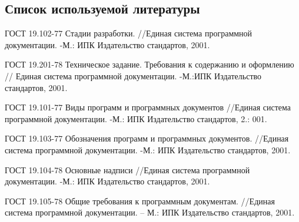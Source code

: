 \subsection{Список используемой литературы}
\begin{my_enumerate}

\item
ГОСТ 19.102-77 Стадии разработки. //Единая система программной документации. -М.: ИПК Издательство стандартов, 2001. \\

\item
ГОСТ 19.201-78 Техническое задание. Требования к содержанию и оформлению // Единая система программной документации. -М.:ИПК Издательство стандартов, 2001. \\

\item
ГОСТ 19.101-77 Виды программ и программных документов
//Единая система программной документации. -М.: ИПК Издательство стандартов, 2.: 001. \\

\item
ГОСТ 19.103-77 Обозначения программ и программных документов. //Единая система программной документации. -М.: ИПК Издательство стандартов, 2001. \\

\item
ГОСТ 19.104-78 Основные надписи //Единая система программной документации. -М.: ИПК Издательство стандартов, 2001. \\

\item 
ГОСТ 19.105-78 Общие требования к программным документам. //Единая система
программной документации. – М.: ИПК Издательство стандартов, 2001. \\

\end{my_enumerate}


